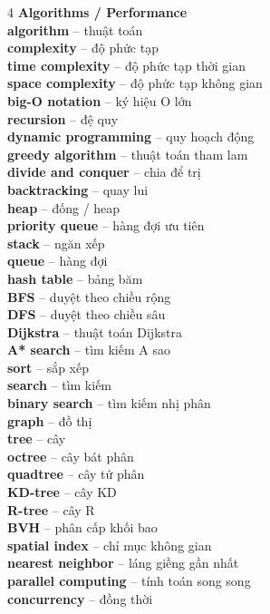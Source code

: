 \begin{multicols}{4}
\textbf{Algorithms / Performance}\\
\textbf{algorithm} -- thuật toán\\
\textbf{complexity} -- độ phức tạp\\
\textbf{time complexity} -- độ phức tạp thời gian\\
\textbf{space complexity} -- độ phức tạp không gian\\
\textbf{big-O notation} -- ký hiệu O lớn\\
\textbf{recursion} -- đệ quy\\
\textbf{dynamic programming} -- quy hoạch động\\
\textbf{greedy algorithm} -- thuật toán tham lam\\
\textbf{divide and conquer} -- chia để trị\\
\textbf{backtracking} -- quay lui\\
\textbf{heap} -- đống / heap\\
\textbf{priority queue} -- hàng đợi ưu tiên\\
\textbf{stack} -- ngăn xếp\\
\textbf{queue} -- hàng đợi\\
\textbf{hash table} -- bảng băm\\
\textbf{BFS} -- duyệt theo chiều rộng\\
\textbf{DFS} -- duyệt theo chiều sâu\\
\textbf{Dijkstra} -- thuật toán Dijkstra\\
\textbf{A* search} -- tìm kiếm A sao\\
\textbf{sort} -- sắp xếp\\
\textbf{search} -- tìm kiếm\\
\textbf{binary search} -- tìm kiếm nhị phân\\
\textbf{graph} -- đồ thị\\
\textbf{tree} -- cây\\
\textbf{octree} -- cây bát phân\\
\textbf{quadtree} -- cây tứ phân\\
\textbf{KD-tree} -- cây KD\\
\textbf{R-tree} -- cây R\\
\textbf{BVH} -- phân cấp khối bao\\
\textbf{spatial index} -- chỉ mục không gian\\
\textbf{nearest neighbor} -- láng giềng gần nhất\\
\textbf{parallel computing} -- tính toán song song\\
\textbf{concurrency} -- đồng thời\\

\end{multicols}
